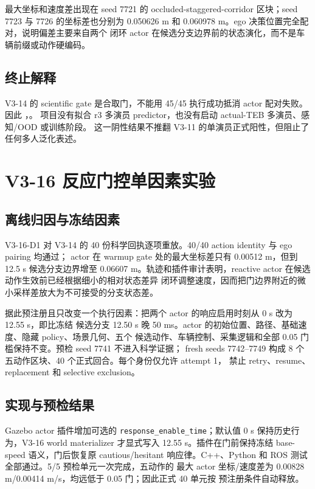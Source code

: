 \documentclass[12pt,a4paper,oneside]{report}
\newcommand{\code}[1]{\texttt{#1}}
\begin{document}
最大坐标和速度差出现在 seed 7721 的 occluded-staggered-corridor 区块；seed 7723 与 7726
的坐标差也分别为 0.050626 m 和 0.060978 m。ego 决策位置完全配对，说明偏差主要来自两个
闭环 actor 在候选分支边界前的状态演化，而不是车辆前缀或动作硬编码。

\section{终止解释}
V3-14 的 scientific gate 是合取门，不能用 45/45 执行成功抵消 actor 配对失败。因此
，。
项目没有拟合 r3 多演员 predictor，也没有启动 actual-TEB 多演员、感知/OOD 或训练阶段。
这一阴性结果不推翻 V3-11 的单演员正式阳性，但阻止了任何多人泛化表述。

\chapter{V3-16 反应门控单因素实验}
\section{离线归因与冻结因素}
V3-16-D1 对 V3-14 的 40 份科学回执逐项重放。40/40 action identity 与 ego pairing 均通过；
actor 在 warmup gate 处的最大坐标差只有 0.00512 m，但到 12.5 s 候选分支边界增至
0.06607 m。轨迹和插件审计表明，reactive actor 在候选动作生效前已经根据细小的相对状态差异
闭环调整速度，因而把门边界附近的微小采样差放大为不可接受的分支状态差。

据此预注册且只改变一个执行因素：把两个 actor 的响应启用时刻从 0 s 改为 12.55 s，即比冻结
候选分支 12.50 s 晚 50 ms。actor 的初始位置、路径、基础速度、隐藏 policy、场景几何、五个
候选动作、车辆控制、采集逻辑和全部 0.05 门槛保持不变。预检 seed 7741 不进入科学证据；
fresh seeds 7742--7749 构成 8 个五动作区块、40 个正式回合。每个身份仅允许 attempt 1，
禁止 retry、resume、replacement 和 selective exclusion。

\section{实现与预检结果}
Gazebo actor 插件增加可选的 \code{response\_enable\_time}；默认值 0 s 保持历史行为，V3-16
world materializer 才显式写入 12.55 s。插件在门前保持冻结 base-speed 语义，门后恢复原
cautious/hesitant 响应律。C++、Python 和 ROS 测试全部通过。5/5 预检单元一次完成，五动作的
最大 actor 坐标/速度差为 0.00828 m/0.00414 m/s，均远低于 0.05 门；因此正式 40 单元按
预注册条件自动释放。
\end{document}
